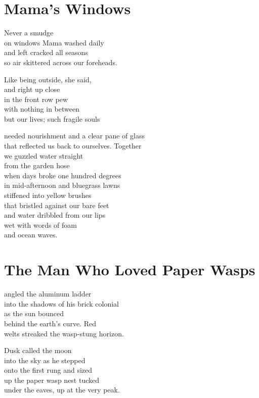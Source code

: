 \documentclass[twoside,10pt]{book}
\begin{document}
\clearpage
\section{Mama's Windows}

Never a smudge\\
on windows Mama washed daily\\
and left cracked all seasons\\
so air skittered across our foreheads.

Like being outside, she said,\\
and right up close\\
in the front row pew\\
with nothing in between\\
but our lives; such fragile souls

needed nourishment and a clear pane of glass\\
that reflected us back to ourselves. Together\\
we guzzled water straight\\
from the garden hose\\
when days broke one hundred degrees\\
in mid-afternoon and bluegrass lawns\\
stiffened into yellow brushes\\
that bristled against our bare feet\\
and water dribbled from our lips\\
wet with words of foam\\
and ocean waves.


\clearpage
\section{The Man Who Loved Paper Wasps}

angled the aluminum ladder\\
into the shadows of his brick colonial\\
as the sun bounced\\
behind the earth's curve. Red\\
welts streaked the wasp-stung horizon.

Dusk called the moon\\
into the sky as he stepped\\
onto the first rung and sized\\
up the paper wasp nest tucked\\
under the eaves, up at the very peak.
\end{document}

